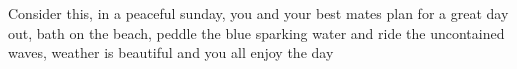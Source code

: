 Consider this, in a peaceful sunday, you and your best mates plan for a great day out, bath on the beach, peddle the blue sparking water and ride the uncontained waves, weather is beautiful and you all enjoy the day